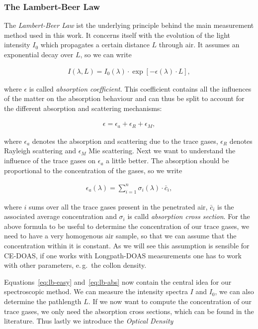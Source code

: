 \subsubsection{The Lambert-Beer Law}
\label{sec:lambert-beer}

The \emph{Lambert-Beer Law} ist the underlying principle behind the
main measurement method used in this work. It concerns itself with the
evolution of the light intensity $I_0$ which propagates a certain
distance $L$ through air. It assumes an exponential decay over $L$, so
we can write

\begin{align}
  I(\lambda, L) = I_0(\lambda) \cdot \exp[-\epsilon(\lambda) \cdot
  L], \label{eq:lb-easy}
\end{align}

where $\epsilon$ is called \emph{absorption coefficient}. This
coefficient contains all the influences of the matter on the
absorption behaviour and can thus be split to account for the different
absorption and scattering mechanisms:

\begin{align*}
  \epsilon = \epsilon_a + \epsilon_R + \epsilon_M,
\end{align*}

where $\epsilon_a$ denotes the absorption and scattering due to the
trace gases, $\epsilon_R$ denotes Rayleigh scattering and $\epsilon_M$
Mie scattering. Next we want to understand the influence of the trace
gases on $\epsilon_a$ a little better. The absorption should be
proportional to the concentration of the gases, so we write

\begin{align}
  \epsilon_a(\lambda) = \sum_{i=1}^n \sigma_i(\lambda) \cdot \bar c_i, \label{eq:lb-abs}
\end{align}

where $i$ sums over all the trace gases present in the penetrated
air, $\bar c_i$ is the associated average concentration and $\sigma_i$
is calld \emph{absorption cross section}. For the above formula to be
useful to determine the concentration of our trace gases, we need to
have a very homogenous air sample, so that we can assume that the
concentration within it is constant. As we will see this assumption is
sensible for CE-DOAS, if one works with Longpath-DOAS measurements one
has to work with other parameters, e.\,g.\ the collon density.

Equations~\eqref{eq:lb-easy} and~\eqref{eq:lb-abs} now contain the central idea for our
spectroscopic method. We can measure the intensity spectra $I$ and
$I_0$, we can also determine the pathlength $L$. If we now want to
compute the concentration of our trace gases, we only need the
absorption cross sections, which can be found in the
literature. Thus lastly we introduce the \emph{Optical
  Density} 

